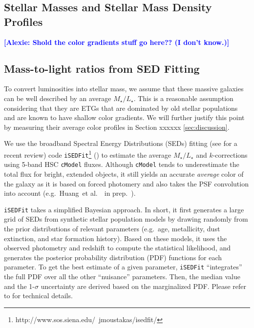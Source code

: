 \documentclass{emulateapj}
\def\etal{{\ et al.~}}
\def\cmodel{\texttt{cModel}}
\def\m2l{{$M_{\star}/L_{\star}$}}
\newcommand{\alexie}[1]{\textcolor{blue}{\textbf{[Alexie: #1]}}}
\begin{document}
\begin{CJK*}{UTF8}{gbsn}
    
      
 
     

    

\section{Stellar Masses and Stellar Mass Density Profiles}
    \label{sec:mstar}
    
    \alexie{Shold the color gradients stuff go here?? (I don't know.)}
    
\subsection{Mass-to-light ratios from SED Fitting}
    \label{ssec:isedfit}
   
    To convert luminosities into stellar mass, we assume that these massive 
    galaxies can be well described by an average \m2l{}. 
    This is a reasonable assumption considering that they are ETGs that are dominated by 
    old stellar populations and are known to have shallow color gradients. 
    We will further justify this point by measuring their average color profiles in Section xxxxxx
    \ref{sec:discussion}.

    We use the broadband Spectral Energy Distributions (SEDs) fitting 
    (see \citealt{Walcher2011} for a recent review) code 
    \texttt{iSEDFit}\footnote{http://www.sos.siena.edu/~jmoustakas/isedfit/} 
    (\citealt{Moustakas13}) to estimate the average \m2l{} and $k$-corrections using
    5-band HSC \cmodel{} fluxes. 
    Although \cmodel{} tends to underestimate the total flux for bright, extended 
    objects, it still yields an accurate \emph{average} color 
    of the galaxy as it is based on forced photomery and also takes the PSF convolution into account
    (e.g.\ Huang\etal~in prep.~). 

    \texttt{iSEDFit} takes a simplified Bayesian approach. 
    In short, it first generates a large grid of SEDs from synthetic stellar population 
    models by drawing randomly from the prior distributions of relevant parameters 
    (e.g.\ age, metallicity, dust extinction, and star formation history).
    Based on these models, it uses the observed photometry and redshift to compute the 
    statistical likelihood, and generates the posterior probability distribution (PDF) 
    functions for each parameter.  
    To get the best estimate of a given parameter, \texttt{iSEDFit} ``integrates'' the 
    full PDF over all the other ``nuisance'' parameters.
    Then, the median value and the 1-$\sigma$ uncertainty are derived based on the marginalized PDF. Please refer to \citet{Moustakas13} for technical details. 
    

\end{CJK*}
\end{document}
